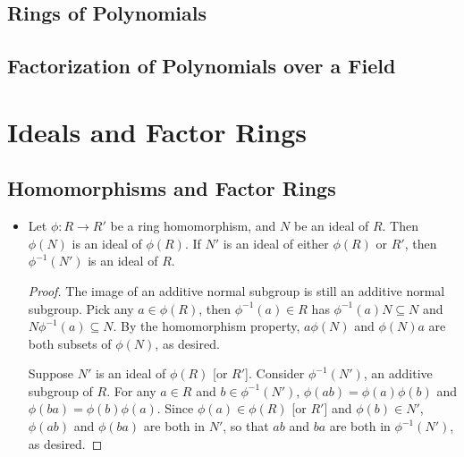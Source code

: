 \documentclass[11pt]{article}
\begin{document}
\subsection{Rings of Polynomials}
\subsection{Factorization of Polynomials over a Field}



\section{Ideals and Factor Rings}
\setcounter{subsection}{25}
\subsection{Homomorphisms and Factor Rings}
\begin{itemize}
    \item Let $\phi: R \to R'$ be a ring homomorphism, and $N$ be an ideal of $R$. Then $\phi(N)$ is an ideal of $\phi(R)$. If $N'$ is an ideal of either $\phi(R)$ or $R'$, then $\phi^{-1}(N')$ is an ideal of $R$.    
    \begin{proof}
        The image of an additive normal subgroup is still an additive normal subgroup. Pick any $a \in \phi(R)$, then $\phi^{-1}(a) \in R$ has $\phi^{-1}(a)N \subseteq N$ and $N\phi^{-1}(a) \subseteq N$. By the homomorphism property, $a \phi(N)$ and $\phi(N)a$ are both subsets of $\phi(N)$, as desired.

        Suppose $N'$ is an ideal of $\phi(R)$ [or $R'$]. Consider $\phi^{-1}(N')$, an additive subgroup of $R$. For any $a \in R$ and $b \in \phi^{-1}(N')$, $\phi(ab)=\phi(a)\phi(b)$ and $\phi(ba)=\phi(b)\phi(a)$. Since $\phi(a) \in \phi(R)$ [or $R'$] and $\phi(b) \in N'$, $\phi(ab)$ and $\phi(ba)$ are both in $N'$, so that $ab$ and $ba$ are both in $\phi^{-1}(N')$, as desired.
    \end{proof}
\end{itemize}
\end{document}
